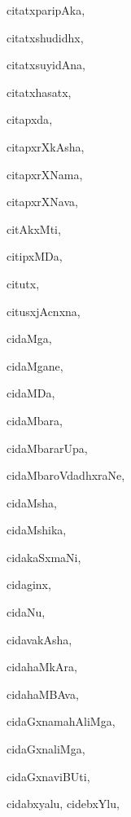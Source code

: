 \begin{multicols}{3}
{\noindent
{citatxparipAka}, \pageref{citatxparipAka}

\noindent
{citatxshudidhx}, \pageref{citatxshudidhx}

\noindent
{citatxsuyidAna}, \pageref{citatxsuyidAna}

\noindent
{citatxhasatx}, \pageref{citatxhasatx}

\noindent
{citapxda}, \pageref{citapxda}

\noindent
{citapxrXkAsha}, \pageref{citapxrXkAsha}

\noindent
{citapxrXNama}, \pageref{citapxrXNama}

\noindent
{citapxrXNava}, \pageref{citapxrXNava}

\noindent
{citAkxMti}, \pageref{citAkxMti}

\noindent
{citipxMDa}, \pageref{citipxMDa}

\noindent
{citutx}, \pageref{citutx}

\noindent
{citusxjAcnxna}, \pageref{citusxjAcnxna}

\noindent
{cidaMga}, \pageref{cidaMga}

\noindent
{cidaMgane}, \pageref{cidaMgane}

\noindent
{cidaMDa}, \pageref{cidaMDa}

\noindent
{cidaMbara}, \pageref{cidaMbara}

\noindent
{cidaMbararUpa}, \pageref{cidaMbararUpa}

\noindent
{cidaMbaroVdadhxraNe}, \pageref{cidaMbaroVdadhxraNe}

\noindent
{cidaMsha}, \pageref{cidaMsha}

\noindent
{cidaMshika}, \pageref{cidaMshika}

\noindent
{cidakaSxmaNi}, \pageref{cidakaSxmaNi}

\noindent
{cidaginx}, \pageref{cidaginx}

\noindent
{cidaNu}, \pageref{cidaNu}

\noindent
{cidavakAsha}, \pageref{cidavakAsha}

\noindent
{cidahaMkAra}, \pageref{cidahaMkAra}

\noindent
{cidahaMBAva}, \pageref{cidahaMBAva}

\noindent
{cidaGxnamahAliMga}, \pageref{cidaGxnamahAliMga}

\noindent
{cidaGxnaliMga}, \pageref{cidaGxnaliMga}

\noindent
{cidaGxnaviBUti}, \pageref{cidaGxnaviBUti}

\noindent
{cidabxyalu, cidebxYlu}, \pageref{cidabxyalu, cidebxYlu}

}
\end{multicols}

